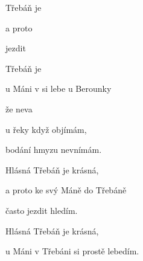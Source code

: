 
\zr
{} Třebáň je 

a proto  

 jezdit 

 Třebáň je 

u Máni v  si  lebe
\kr
\zs
{} u Berounky 

 že   neva

 u řeky když  objímám,

 bodání hmyzu  nevnímám.  \ks

\zr
Hlásná Třebáň je krásná,

a proto ke svý Máně do Třebáně 

často jezdit hledím. 

Hlásná Třebáň je krásná, 

u Máni v Třebáni si prostě lebedím.
\kr
\kp



